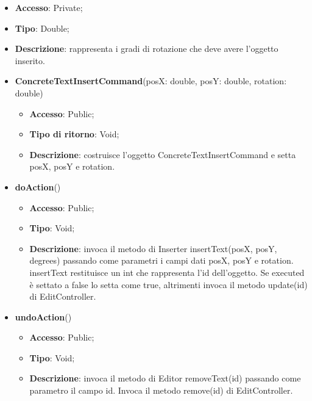{{{\begin{itemize}
			\begin{itemize}
				\item \textbf{Accesso}: Private;
				\item \textbf{Tipo}: Double;
				\item \textbf{Descrizione}: rappresenta i gradi di rotazione che deve avere l’oggetto inserito.
			\end{itemize}
	\end{itemize}
	\begin{itemize}
		\item \textbf{ConcreteTextInsertCommand}(posX: double, posY: double, rotation: double)
		\begin{itemize}
			\item \textbf{Accesso}: Public;
			\item \textbf{Tipo di ritorno}: Void;
			\item \textbf{Descrizione}: costruisce l’oggetto ConcreteTextInsertCommand e setta posX, posY e rotation.
		\end{itemize}
		\item \textbf{doAction}()
		\begin{itemize}
			\item \textbf{Accesso}: Public;
			\item \textbf{Tipo}: Void;
			\item \textbf{Descrizione}: invoca il metodo di Inserter insertText(posX, posY, degrees) passando come parametri i  campi dati posX, posY e rotation. insertText restituisce un int che rappresenta l’id dell’oggetto. Se executed è settato a false lo setta come true, altrimenti invoca il metodo update(id) di EditController.
		\end{itemize}
		\item \textbf{undoAction}()
		\begin{itemize}
			\item \textbf{Accesso}: Public;
			\item \textbf{Tipo}: Void;
			\item \textbf{Descrizione}: invoca il metodo di Editor removeText(id) passando come parametro il campo id. Invoca il metodo remove(id) di EditController.
		\end{itemize}
	\end{itemize}
	}
	
}}
